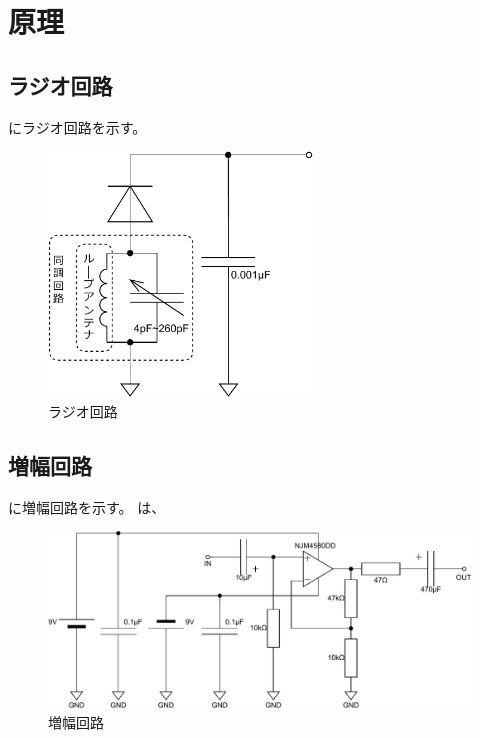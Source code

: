 \documentclass[report.tex]{subfiles}
\begin{document}
\section{原理}

\subsection{ラジオ回路}

にラジオ回路を示す。

\begin{figure}[H]
	\centering
	\includegraphics[width=7cm]{fig/radio.pdf}
	\caption{ラジオ回路}
	\label{fig:radio-circuit}
\end{figure}

\subsection{増幅回路}

に増幅回路を示す。
は、

\begin{figure}[H]
	\centering
	\includegraphics[width=13cm]{fig/amp.pdf}
	\caption{増幅回路}
	\label{fig:amplifier-circuit}
\end{figure}
\end{document}
